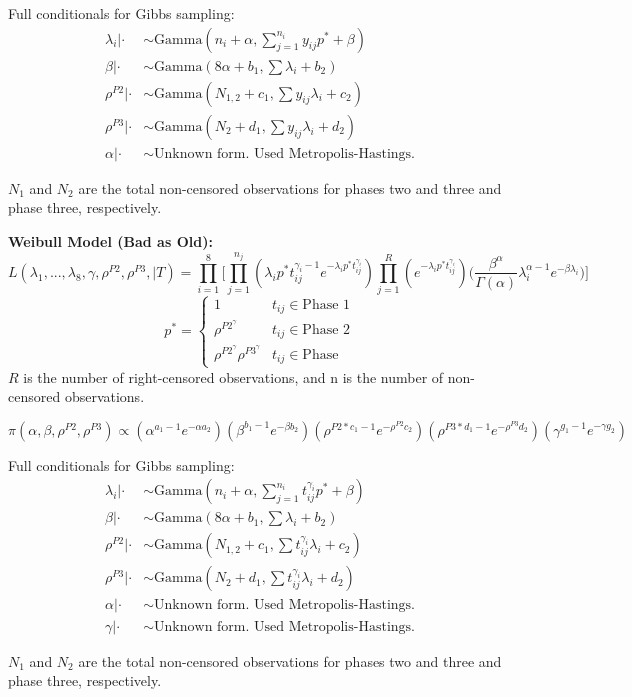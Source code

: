 \documentclass[12pt]{article}
\begin{document}
Full conditionals for Gibbs sampling:
\begin{align*}
\lambda_i|\cdot &\sim \text{Gamma}(n_i + \alpha, \sum_{j=1}^{n_i}y_{ij}p^* + \beta) \\
\beta|\cdot &\sim \text{Gamma}(8\alpha + b_1, \sum{\lambda_i} + b_2) \\
\rho^{P2}|\cdot &\sim \text{Gamma}(N_{1,2} + c_1, \sum{y_{ij}\lambda_i} + c_2) \\
\rho^{P3}|\cdot &\sim \text{Gamma}(N_{2} + d_1, \sum{y_{ij}\lambda_i} + d_2) \\
\alpha|\cdot &\sim \text{Unknown form.  Used Metropolis-Hastings.}
\end{align*}

$N_1$ and $N_2$ are the total non-censored observations for phases two and three
and phase three, respectively.

\textbf{Weibull Model (Bad as Old):}
\begin{equation*}
  L(\lambda_1, ..., \lambda_8, \gamma, \rho^{P2}, \rho^{P3}, \vert T) = \prod_{i =
    1}^8 \Bigg[\prod_{j = 1}^{n_j}(\lambda_i p^*t_{ij}^{\gamma_i-1} e^{-\lambda_i
    p^* t_{ij}^{\gamma_i}})\prod_{j = 1}^R(e^{-\lambda_i p^*
    t_{ij}^{\gamma_i}})\Big(\frac{\beta^\alpha}{\Gamma(\alpha)}\lambda_i^{\alpha -
    1}e^{-\beta\lambda_i}\Big)\Bigg]
\end{equation*}
\[p^* =   \left\{
\begin{array}{ll}
      1 & t_{ij}\in \text{Phase 1} \\
      \rho^{P2^\gamma} & t_{ij} \in \text{Phase 2} \\
      \rho^{P2^\gamma} \rho^{P3^\gamma} & t_{ij} \in \text{Phase }
\end{array}
\right. \]
$R$ is the number of right-censored observations, and n is the number of
non-censored observations.

\begin{equation*}
\pi(\alpha, \beta, \rho^{P2}, \rho^{P3}) \propto (\alpha^{a_1-1}e^{-\alpha
  a_2})(\beta^{b_1 - 1}e^{-\beta b_2})(\rho^{P2*c_1 - 1}e^{-\rho^{P2}
  c_2})(\rho^{P3 * d_1 - 1}e^{-\rho^{P3} d_2})(\gamma^{g_1 - 1}e^{-\gamma g_2})
\end{equation*}

Full conditionals for Gibbs sampling:
\begin{align*}
\lambda_i|\cdot &\sim \text{Gamma}(n_i + \alpha, \sum_{j=1}^{n_i}t_{ij}^{\gamma_i} p^* + \beta) \\
\beta|\cdot &\sim \text{Gamma}(8\alpha + b_1, \sum{\lambda_i} + b_2) \\
\rho^{P2}|\cdot &\sim \text{Gamma}(N_{1,2} + c_1, \sum{t_{ij}^{\gamma_i} \lambda_i} + c_2) \\
\rho^{P3}|\cdot &\sim \text{Gamma}(N_{2} + d_1, \sum{t_{ij}^{\gamma_i} \lambda_i} + d_2) \\
\alpha|\cdot &\sim \text{Unknown form.  Used Metropolis-Hastings.}\\
\gamma|\cdot &\sim \text{Unknown form.  Used Metropolis-Hastings.}
\end{align*}

$N_1$ and $N_2$ are the total non-censored observations for phases two and three
and phase three, respectively.
\end{document}
